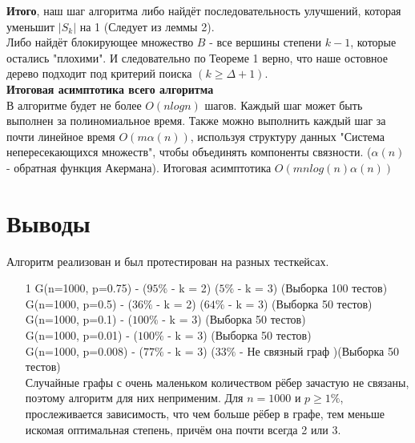 \documentclass[a4paper, 12pt]{article}
\begin{document}
\textbf{Итого}, наш шаг алгоритма либо найдёт последовательность улучшений, которая уменьшит $|S_k|$ на 1 (Следует из леммы 2).\\
Либо найдёт блокирующее множество $B$ - все вершины степени $k - 1$, которые остались "плохими". И следовательно по Теореме 1 верно, что наше остовное дерево подходит под критерий поиска $(k \geqslant \Delta + 1)$.\\

\textbf{Итоговая асимптотика всего алгоритма}\\
В алгоритме будет не более $O(nlogn)$ шагов. Каждый шаг может быть выполнен за полиномиальное время. Также можно выполнить каждый шаг за почти линейное время $O(m\alpha({n}))$, используя структуру данных "Система непересекающихся множеств", чтобы объединять компоненты связности. ($\alpha(n)$ - обратная функция Акермана). Итоговая асимптотика $O(m n log(n)\alpha(n))$


\section{Выводы}

Алгоритм реализован и был протестирован на разных тесткейсах.

\begin{enumerate}

\item[1] G(n=1000, p=0.75) - ($95\%$ - k = 2) ($5\%$ - k = 3) (Выборка 100 тестов)\\
G(n=1000, p=0.5) - ($36\%$ - k = 2) ($64\%$ - k = 3) (Выборка 50 тестов)\\
G(n=1000, p=0.1) - ($100\%$ - k = 3) (Выборка 50 тестов)\\
G(n=1000, p=0.01) - ($100\%$ - k = 3) (Выборка 50 тестов)\\
G(n=1000, p=0.008) - ($77\%$ - k = 3) ($33\%$ - Не связный граф )(Выборка 50 тестов)\\

Случайные графы с очень маленьком количеством рёбер зачастую не связаны, поэтому алгоритм для них неприменим.
Для $n = 1000$ и $p \geqslant 1\%$, прослеживается зависимость, что чем больше рёбер в графе, тем меньше искомая оптимальная степень, причём она почти всегда 2 или 3.



\end{enumerate}
\end{document}

